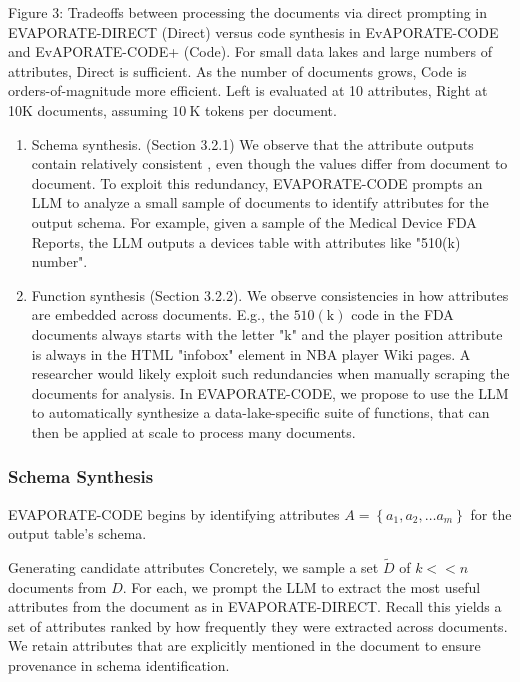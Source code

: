 \documentclass[10pt]{article}
\begin{document}
Figure 3: Tradeoffs between processing the documents via direct prompting in EVAPORATE-DIRECT (Direct) versus code synthesis in EvAPORATE-CODE and EvAPORATE-CODE+ (Code). For small data lakes and large numbers of attributes, Direct is sufficient. As the number of documents grows, Code is orders-of-magnitude more efficient. Left is evaluated at 10 attributes, Right at 10K documents, assuming $10 \mathrm{~K}$ tokens per document.

\begin{enumerate}
  \item Schema synthesis. (Section 3.2.1) We observe that the attribute outputs contain relatively consistent , even though the values differ from document to document. To exploit this redundancy, EVAPORATE-CODE prompts an LLM to analyze a small sample of documents to identify attributes for the output schema. For example, given a sample of the Medical Device FDA Reports, the LLM outputs a devices table with attributes like "510(k) number".

  \item Function synthesis (Section 3.2.2). We observe consistencies in how attributes are embedded across documents. E.g., the $510(\mathrm{k})$ code in the FDA documents always starts with the letter "k" and the player position attribute is always in the HTML "infobox" element in NBA player Wiki pages. A researcher would likely exploit such redundancies when manually scraping the documents for analysis. In EVAPORATE-CODE, we propose to use the LLM to automatically synthesize a data-lake-specific suite of functions, that can then be applied at scale to process many documents.

\end{enumerate}

\subsubsection{Schema Synthesis}
EVAPORATE-CODE begins by identifying attributes $A=\left\{a_{1}, a_{2}, \ldots a_{m}\right\}$ for the output table's schema.

Generating candidate attributes Concretely, we sample a set $\tilde{D}$ of $k<<n$ documents from $D$. For each, we prompt the LLM to extract the most useful attributes from the document as in EVAPORATE-DIRECT. Recall this yields a set of attributes ranked by how frequently they were extracted across documents. We retain attributes that are explicitly mentioned in the document to ensure provenance in schema identification.
\end{document}
